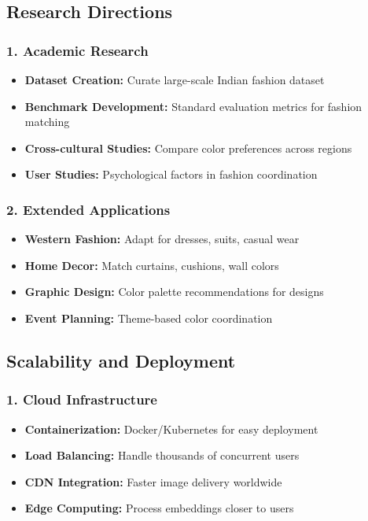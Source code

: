 \documentclass[12pt,a4paper]{report}
\begin{document}
\subsection{Research Directions}

\subsubsection{1. Academic Research}
\begin{itemize}
    \item \textbf{Dataset Creation:} Curate large-scale Indian fashion dataset
    \item \textbf{Benchmark Development:} Standard evaluation metrics for fashion matching
    \item \textbf{Cross-cultural Studies:} Compare color preferences across regions
    \item \textbf{User Studies:} Psychological factors in fashion coordination
\end{itemize}

\subsubsection{2. Extended Applications}
\begin{itemize}
    \item \textbf{Western Fashion:} Adapt for dresses, suits, casual wear
    \item \textbf{Home Decor:} Match curtains, cushions, wall colors
    \item \textbf{Graphic Design:} Color palette recommendations for designs
    \item \textbf{Event Planning:} Theme-based color coordination
\end{itemize}

\subsection{Scalability and Deployment}

\subsubsection{1. Cloud Infrastructure}
\begin{itemize}
    \item \textbf{Containerization:} Docker/Kubernetes for easy deployment
    \item \textbf{Load Balancing:} Handle thousands of concurrent users
    \item \textbf{CDN Integration:} Faster image delivery worldwide
    \item \textbf{Edge Computing:} Process embeddings closer to users
\end{itemize}
\end{document}
